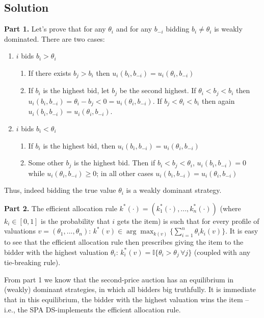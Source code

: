 \documentclass[a4paper]{article}
\begin{document}
\subsection{Solution}
\textbf{Part 1.}
Let's prove that for any $\theta_{i}$
and for any $b_{-i}$ bidding $b_{i}\neq \theta_{i}$ is weakly dominated.
There are two cases:
\begin{enumerate}
	\item $i$ bids $b_{i}>\theta_{i}$
	\begin{enumerate}
		\item If there exists $b_{j}>b_{i}$ then $u_{i}(b_{i},b_{-i})=u_{i}(\theta_{i},b_{-i})$
		\item If $b_{i}$ is the highest bid, let $b_{j}$ be the second highest.
		If $\theta_{i}<b_{j}<b_{i}$ then $u_{i}(b_{i},b_{-i})=\theta_{i}-b_{j}<0=u_{i}(\theta_{i},b_{-i})$.
		If $b_{j}<\theta_{i}<b_{i}$ then again $u_{i}(b_{i},b_{-i})=u_{i}(\theta_{i},b_{-i})$.
	\end{enumerate}
	\item $i$ bids $b_{i}<\theta_{i}$
	\begin{enumerate}
		\item If $b_{i}$ is the highest bid, then $u_{i}(b_{i},b_{-i})=u_{i}(\theta_{i},b_{-i})$
		\item Some other $b_{j}$ is the highest bid. Then if $b_{i}<b_{j}<\theta_{i}$,
		$u_{i}(b_{i},b_{-i})=0$ while $u_{i}(\theta_{i},b_{-i})\geq0$; in all
		other cases $u_{i}(b_{i},b_{-i})=u_{i}(\theta_{i},b_{-i})$ 
	\end{enumerate}
\end{enumerate}
Thus, indeed bidding the true value $\theta_{i}$ is a weakly dominant
strategy.

\textbf{Part 2.}
The efficient allocation rule $k^*(\cdot) = (k^*_1(\cdot),...,k^*_n(\cdot))$ (where $k_i \in [0,1]$ is the probability that $i$ gets the item) is such that for every profile of valuations $v=(\theta_1,...,\theta_n)$: $k^*(v) \in \arg \max_{k(v)} \{ \sum_{i=1}^n \theta_i k_i(v) \}$. It is easy to see that the efficient allocation rule then prescribes giving the item to the bidder with the highest valuation $\theta_i$: $k^*_i(v) = \mathbb{I} \{ \theta_i > \theta_j \, \forall j \}$ (coupled with any tie-breaking rule). 

From part 1 we know that the second-price auction has an equilibrium in (weakly) dominant strategies, in which all bidders big truthfully. It is immediate that in this equilibrium, the bidder with the highest valuation wins the item -- i.e., the SPA DS-implements the efficient allocation rule.
\fi 

\end{document}
